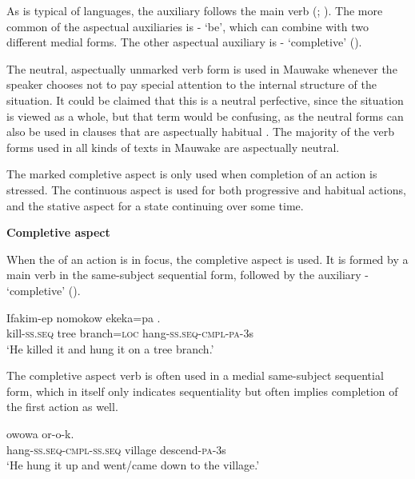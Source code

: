  As is typical of  languages, the auxiliary follows the main verb (\citealt[85]{Greenberg1966}; \citealt[90]{Dryer2007a}). The more common of the aspectual auxiliaries is - `be', which can combine with two different medial forms. The other aspectual auxiliary is - `completive' (). 

The neutral, aspectually unmarked verb form is used in Mauwake whenever the speaker chooses not to pay special attention to the internal structure of the situation. It could be claimed that this is a neutral perfective, since the situation is viewed as a whole, but that term would be confusing, as the neutral forms can also be used in clauses that are aspectually habitual \citep[cf.][239]{Payne1997}. The majority of the verb forms used in all kinds of texts in Mauwake are aspectually neutral.

The marked completive aspect is only used when completion of an action is stressed. The continuous aspect is used for both progressive and habitual actions, and the stative aspect for a state continuing over some time.

{\bfseries
{}
Completive aspect}\label{sec:3.8.5.1.1.1}

When the  of an action is in focus, the completive aspect is used. It is formed by a main verb in the same-subject sequential form, followed by the auxiliary - `completive' ().

\ea%
\label{ex:3:x361}
\gll Ifakim-ep nomokow ekeka=pa . \\
kill-\textsc{ss}.\textsc{seq} tree branch=\textsc{loc} hang-\textsc{ss}.\textsc{seq}-\textsc{cmpl}-\textsc{pa}-3s \\
\glt`He killed it and hung it on a tree branch.'
\z

The completive aspect verb is often used in a medial same-subject sequential form, which in itself only indicates sequentiality but often implies completion of the first action as well. 

\ea%
\label{ex:3:x362}
\gll {} owowa or-o-k. \\
hang-\textsc{ss}.\textsc{seq}-\textsc{cmpl}-\textsc{ss}.\textsc{seq} village descend-\textsc{pa}-3s\\
\glt`He hung it up and went/came down to the village.'
\z

